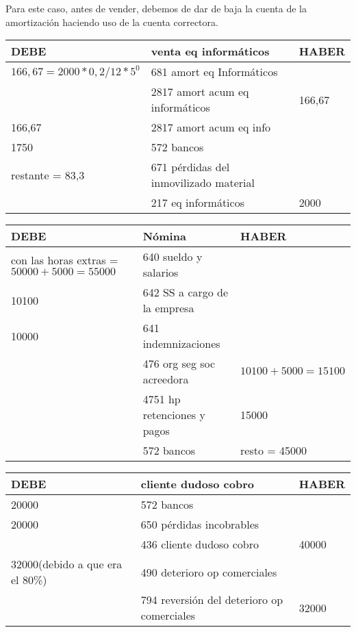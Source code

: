 \documentclass[a4paper,12pt]{article}
\begin{document}
Para este caso, antes de vender, debemos de dar de baja la cuenta de la amortización haciendo uso de la cuenta correctora.
\begin{table}[H]
    \centering
    \begin{tabular}{|p{3cm}|p{6cm}|p{3cm}|}
    \hline
    \textbf{DEBE} & \textbf{venta eq informáticos} & \textbf{HABER} \\
    \hline
    $166,67 = 2000 * 0,2 / 12 * 5 ^0$& 681 amort eq Informáticos & \\
    \hline
    & 2817 amort acum eq informáticos & 166,67\\
    \hline
    166,67 & 2817 amort acum eq info& \\
    \hline
    1750 & 572 bancos & \\
    \hline
    restante = 83,3& 671 pérdidas del inmovilizado material& \\
    \hline
    & 217 eq informáticos & 2000 \\
    \hline
    \end{tabular}
\end{table}


\begin{table}[H]
    \centering
    \begin{tabular}{|p{3cm}|p{6cm}|p{3cm}|}
    \hline
    \textbf{DEBE} & \textbf{Nómina} & \textbf{HABER} \\
    \hline
    con las horas extras = $50000+5000 = 55000$& 640 sueldo y salarios& \\
    \hline
    10100& 642 SS a cargo de la empresa & \\
    \hline
    10000& 641 indemnizaciones& \\
    \hline
    & 476 org seg soc acreedora & $10100 + 5000 = 15100$\\
    \hline
    & 4751 hp retenciones y pagos & 15000 \\
    \hline
    &572 bancos & resto = 45000\\
    \hline
    \end{tabular}
\end{table}

\begin{table}[H]
    \centering
    \begin{tabular}{|p{3cm}|p{6cm}|p{3cm}|}
    \hline
    \textbf{DEBE} & \textbf{cliente dudoso cobro} & \textbf{HABER} \\
    \hline
    20000& 572 bancos & \\
    \hline
    20000& 650 pérdidas incobrables& \\
    \hline
    & 436 cliente dudoso cobro & 40000\\
    \hline
    32000(debido a que era el 80\%)& 490 deterioro op comerciales & \\
    \hline
    & 794 reversión del deterioro op comerciales& 32000\\
    \hline
    \end{tabular}
\end{table}
\end{document}
